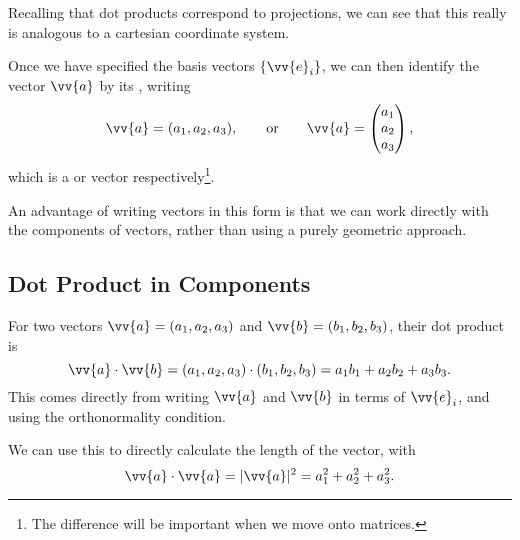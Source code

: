 Recalling that dot products correspond to projections, we can see that this really is analogous to a cartesian coordinate system.

\begin{center}
\end{center}
Once we have specified the basis vectors $\{\vv{e}_i\}$, we can then identify the vector $\vv{a}$ by its , writing 
$$
\vv{a} = (a_1, a_2, a_3), \quad \quad \text{or} \quad \quad \vv{a} = \begin{pmatrix} a_1 \\ a_2 \\ a_3 \end{pmatrix},
$$
which is a  or  vector respectively\footnote{The difference will be important when we move onto matrices.}.

An advantage of writing vectors in this form is that we can work directly with the components of vectors, rather than using a purely geometric approach.

\subsection{Dot Product in Components}

For two vectors $\vv{a} = (a_1, a_2, a_3)$ and $\vv{b} = (b_1, b_2, b_3)$, their dot product is
$$
\vv{a} \cdot \vv{b} = (a_1, a_2, a_3) \cdot (b_1, b_2, b_3) = a_1 b_1 + a_2 b_2 + a_3 b_3.
$$
This comes directly from writing $\vv{a}$ and $\vv{b}$ in terms of $\vv{e}_i$, and using the orthonormality condition.

We can use this to directly calculate the length of the vector,
with
$$
\vv{a}\cdot\vv{a} = |\vv{a}|^2 = a_1 ^2 + a_2 ^2 + a_3^2.
$$

